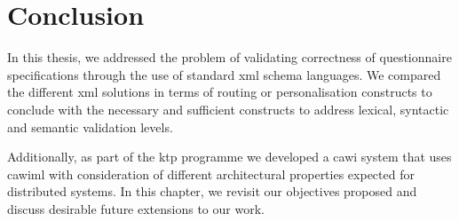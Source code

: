 	\chapter{Conclusion}\label{ch:Conclusion}
	In this thesis, we addressed the problem of validating correctness of questionnaire specifications through the use of standard \gls{xml} schema languages. We compared the different \gls{xml} solutions in terms of routing or personalisation constructs to conclude with the necessary and sufficient constructs to address lexical, syntactic and semantic validation levels. 

	Additionally, as part of the \gls{ktp} programme we developed a \gls{cawi} system that uses \gls{cawiml} with consideration of different architectural properties expected for distributed systems. In this chapter, we revisit our objectives proposed and discuss desirable future extensions to our work.

